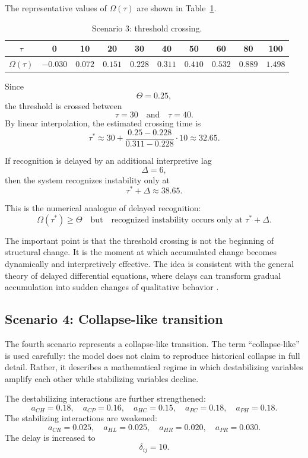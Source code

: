 \documentclass[11pt]{article}
\begin{document}
The representative values of \(\Omega(\tau)\) are shown in Table~\ref{tab:omega_threshold}.

\begin{table}[h!]
	\centering
	\caption{Scenario 3: threshold crossing.}
	\label{tab:omega_threshold}
	\begin{tabular}{cccccccccc}
		\toprule
		\(\tau\) & 0 & 10 & 20 & 30 & 40 & 50 & 60 & 80 & 100 \\
		\midrule
		\(\Omega(\tau)\) 
		& \(-0.030\) & \(0.072\) & \(0.151\) & \(0.228\) & \(0.311\) & \(0.410\) & \(0.532\) & \(0.889\) & \(1.498\) \\
		\bottomrule
	\end{tabular}
\end{table}

Since
\[
\Theta=0.25,
\]
the threshold is crossed between
\[
\tau=30
\quad\text{and}\quad
\tau=40.
\]
By linear interpolation, the estimated crossing time is
\[
\tau^\ast
\approx
30+
\frac{0.25-0.228}{0.311-0.228}\cdot 10
\approx
32.65.
\]

If recognition is delayed by an additional interpretive lag
\[
\Delta=6,
\]
then the system recognizes instability only at
\[
\tau^\ast+\Delta
\approx
38.65.
\]

This is the numerical analogue of delayed recognition:
\[
\Omega(\tau^\ast)\geq \Theta
\quad
\text{but}
\quad
\text{recognized instability occurs only at } \tau^\ast+\Delta.
\]

The important point is that the threshold crossing is not the beginning of structural change. It is the moment at which accumulated change becomes dynamically and interpretively effective. The idea is consistent with the general theory of delayed differential equations, where delays can transform gradual accumulation into sudden changes of qualitative behavior \cite{rihan2021dde,saeedian2022delay}.

\subsection{Scenario 4: Collapse-like transition}

The fourth scenario represents a collapse-like transition. The term ``collapse-like'' is used carefully: the model does not claim to reproduce historical collapse in full detail. Rather, it describes a mathematical regime in which destabilizing variables amplify each other while stabilizing variables decline.

The destabilizing interactions are further strengthened:
\[
a_{CH}=0.18,\quad
a_{CP}=0.16,\quad
a_{HC}=0.15,\quad
a_{PC}=0.18,\quad
a_{PH}=0.18.
\]
The stabilizing interactions are weakened:
\[
a_{CR}=0.025,\quad
a_{HL}=0.025,\quad
a_{HR}=0.020,\quad
a_{PR}=0.030.
\]
The delay is increased to
\[
\delta_{ij}=10.
\]
\end{document}
